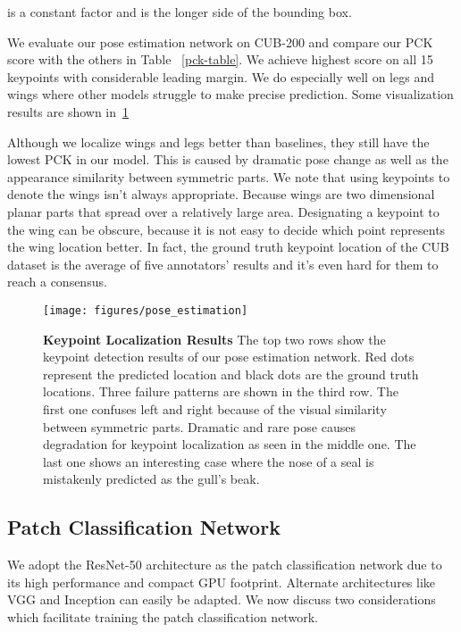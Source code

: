  is a constant factor and  is the longer side of the bounding box.

We evaluate our pose estimation network on CUB-200 and compare our PCK score with the others in Table ~\ref{pck-table}. 
We achieve highest score on all 15 keypoints with considerable leading margin.
We do especially well on legs and wings where other models struggle to make precise prediction.
Some visualization results are shown in~\ref{fig:kp_examples}

Although we localize wings and legs better than baselines, they still have the lowest PCK in our model.
This is caused by dramatic pose change as well as the appearance similarity between symmetric parts.
We note that using keypoints to denote the wings isn't always appropriate.
Because wings are two dimensional planar parts that spread over a relatively large area.
Designating a keypoint to the wing can be obscure,
because it is not easy to decide which point represents the wing location better. 
In fact, the ground truth keypoint location of the CUB dataset is the average of five annotators' results and 
it's even hard for them to reach a consensus. 


\begin{figure}[h]
        \centering
\texttt{[image: figures/pose\_estimation]}
        \label{fig:kp_examples}
        \caption{ {\textbf{Keypoint Localization Results}}
        The top two rows show the keypoint detection results of our pose estimation network. Red dots represent the predicted location and black dots are the ground truth locations. Three failure patterns are shown in the third row. The first one confuses left and right because of the visual similarity between symmetric parts. Dramatic and rare pose causes degradation for keypoint localization as seen in the middle one. The last one shows an interesting case where the nose of a seal is mistakenly predicted as the gull's beak.
         }
\end{figure}



\subsection{Patch Classification Network} \label{sec:patch_network}
We adopt the ResNet-50 architecture as the patch classification network due to its high performance and compact GPU footprint.
Alternate architectures like VGG and Inception can easily be adapted. 
We now discuss two considerations which facilitate training the patch classification network.

